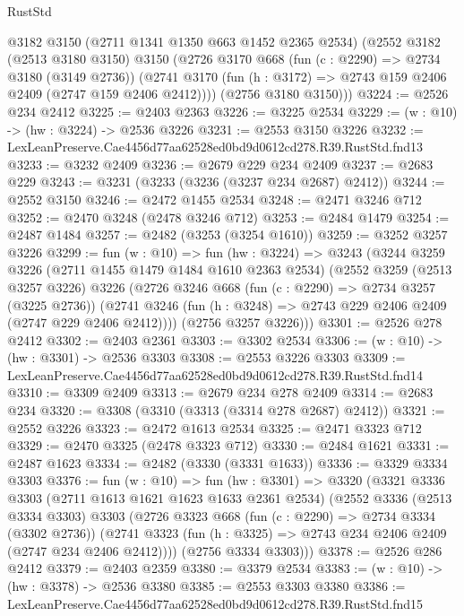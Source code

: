 \begin{lexlean}{RustStd}
\begin{coremodule}
      @3182
      @3150
      (@2711 @1341 @1350 @663 @1452 @2365 @2534)
      (@2552
        @3182
        (@2513 @3180 @3150)
        @3150
        (@2726
          @3170
          @668
          (fun (c : @2290) => @2734 @3180 (@3149 @2736))
          (@2741 @3170 (fun (h : @3172) => @2743 @159 @2406 @2409 (@2747 @159 @2406 @2412))))
        (@2756 @3180 @3150)))
@3224 := @2526 @234 @2412
@3225 := @2403 @2363
@3226 := @3225 @2534
@3229 := (w : @10) -> (hw : @3224) -> @2536 @3226
@3231 := @2553 @3150 @3226
@3232 := LexLeanPreserve.Cae4456d77aa62528ed0bd9d0612cd278.R39.RustStd.fnd13
@3233 := @3232 @2409
@3236 := @2679 @229 @234 @2409
@3237 := @2683 @229
@3243 := @3231 (@3233 (@3236 (@3237 @234 @2687) @2412))
@3244 := @2552 @3150
@3246 := @2472 @1455 @2534
@3248 := @2471 @3246 @712
@3252 := @2470 @3248 (@2478 @3246 @712)
@3253 := @2484 @1479
@3254 := @2487 @1484
@3257 := @2482 (@3253 (@3254 @1610))
@3259 := @3252 @3257 @3226
@3299 := fun (w : @10) =>
  fun (hw : @3224) =>
  @3243
    (@3244
      @3259
      @3226
      (@2711 @1455 @1479 @1484 @1610 @2363 @2534)
      (@2552
        @3259
        (@2513 @3257 @3226)
        @3226
        (@2726
          @3246
          @668
          (fun (c : @2290) => @2734 @3257 (@3225 @2736))
          (@2741 @3246 (fun (h : @3248) => @2743 @229 @2406 @2409 (@2747 @229 @2406 @2412))))
        (@2756 @3257 @3226)))
@3301 := @2526 @278 @2412
@3302 := @2403 @2361
@3303 := @3302 @2534
@3306 := (w : @10) -> (hw : @3301) -> @2536 @3303
@3308 := @2553 @3226 @3303
@3309 := LexLeanPreserve.Cae4456d77aa62528ed0bd9d0612cd278.R39.RustStd.fnd14
@3310 := @3309 @2409
@3313 := @2679 @234 @278 @2409
@3314 := @2683 @234
@3320 := @3308 (@3310 (@3313 (@3314 @278 @2687) @2412))
@3321 := @2552 @3226
@3323 := @2472 @1613 @2534
@3325 := @2471 @3323 @712
@3329 := @2470 @3325 (@2478 @3323 @712)
@3330 := @2484 @1621
@3331 := @2487 @1623
@3334 := @2482 (@3330 (@3331 @1633))
@3336 := @3329 @3334 @3303
@3376 := fun (w : @10) =>
  fun (hw : @3301) =>
  @3320
    (@3321
      @3336
      @3303
      (@2711 @1613 @1621 @1623 @1633 @2361 @2534)
      (@2552
        @3336
        (@2513 @3334 @3303)
        @3303
        (@2726
          @3323
          @668
          (fun (c : @2290) => @2734 @3334 (@3302 @2736))
          (@2741 @3323 (fun (h : @3325) => @2743 @234 @2406 @2409 (@2747 @234 @2406 @2412))))
        (@2756 @3334 @3303)))
@3378 := @2526 @286 @2412
@3379 := @2403 @2359
@3380 := @3379 @2534
@3383 := (w : @10) -> (hw : @3378) -> @2536 @3380
@3385 := @2553 @3303 @3380
@3386 := LexLeanPreserve.Cae4456d77aa62528ed0bd9d0612cd278.R39.RustStd.fnd15

\end{coremodule}
\end{lexlean}
